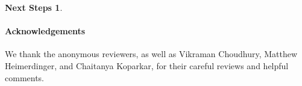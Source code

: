 \documentclass[letterpaper]{article} %
\theoremstyle{definition}
\newtheorem*{nextsteps*}{Next Steps}
\newcommand{\Sunion}{\mathscr{S}^{\cup}}
\newcommand{\Sinter}{\mathscr{S}^{\cap}}
\newcommand{\QFBAPA}{\sf{QFBAPA}}
\newcommand{\CardCompLogic}{\sf{CardCompLogic}}
\newcommand{\Ptime}{\textsc{PTime}}
\newcommand{\NP}{\textsc{NP}}
\newcommand{\More}[2]{\mathsf{More}\,\,#1\,\,#2}
\newcommand{\Most}[2]{\mathsf{Most}\,\,#1\,\,#2}
\newcommand{\MostNoArgs}{\mathsf{Most}}
\newcommand{\card}{\mathrm{card}}
\begin{document}
\begin{nextsteps*}
\end{nextsteps*}

\paragraph{Acknowledgements} We thank the anonymous reviewers, as well as Vikraman Choudhury, Matthew Heimerdinger, and Chaitanya Koparkar, for their careful reviews and helpful comments.






%
\end{document}
